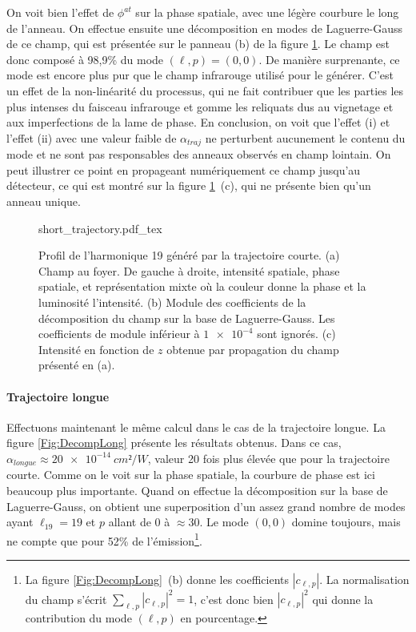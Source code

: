 On voit bien l'effet de $\phi^{at}$ sur la phase spatiale, avec une légère courbure le long de l'anneau. On effectue ensuite une décomposition en modes de Laguerre-Gauss de ce champ, qui est présentée sur le panneau (b) de la figure \ref{Fig:DecompShort}. Le champ est donc composé à 98,9\% du mode $(\ell,p) = (0,0)$. De manière surprenante, ce mode est encore plus pur que le champ infrarouge utilisé pour le générer. C'est un effet de la non-linéarité du processus, qui ne fait contribuer que les parties les plus intenses du faisceau infrarouge et gomme les reliquats dus au vignetage et aux imperfections de la lame de phase. En conclusion, on voit que l'effet (i) et l'effet (ii) avec une valeur faible de $\alpha_{traj}$ ne perturbent aucunement le contenu du mode et ne sont pas responsables des anneaux observés en champ lointain. On peut illustrer ce point en propageant numériquement ce champ jusqu'au détecteur, ce qui est montré sur la figure \ref{Fig:DecompShort}~(c), qui ne présente bien qu'un anneau unique.
\begin{figure}[!ht]
\centering
\def\svgwidth{\columnwidth}
{short_trajectory.pdf_tex}
\caption{Profil de l'harmonique 19 généré par la trajectoire courte. (a) Champ au foyer. De gauche à droite, intensité spatiale, phase spatiale, et représentation mixte où la couleur donne la phase et la luminosité l'intensité. (b) Module des coefficients de la décomposition du champ sur la base de Laguerre-Gauss. Les coefficients de module inférieur à $\num{1e-4}$ sont ignorés. (c) Intensité en fonction de $z$ obtenue par propagation du champ présenté en (a).}
\label{Fig:DecompShort}
\end{figure}

\paragraph*{Trajectoire longue} Effectuons maintenant le même calcul dans le cas de la trajectoire longue. La figure \ref{Fig:DecompLong} présente les résultats obtenus. Dans ce cas, $\alpha_{longue}\approx\SI{20e-14}{cm²/W}$, valeur 20 fois plus élevée que pour la trajectoire courte. Comme on le voit sur la phase spatiale, la courbure de phase est ici beaucoup plus importante. Quand on effectue la décomposition sur la base de Laguerre-Gauss, on obtient une superposition d'un assez grand nombre de modes ayant $\ell_{19}=19$ et $p$ allant de 0 à $\approx 30$. Le mode $(0,0)$ domine toujours, mais ne compte que pour 52\% de l'émission\footnote{La figure \ref{Fig:DecompLong}~(b) donne les coefficients $\left|c_{\ell,p}\right|$. La normalisation du champ s'écrit $\sum_{\ell,p}{\left|c_{\ell,p}\right|^2} = 1$, c'est donc bien $\left|c_{\ell,p}\right|^2$ qui donne la contribution du mode $(\ell,p)$ en pourcentage.}. 


